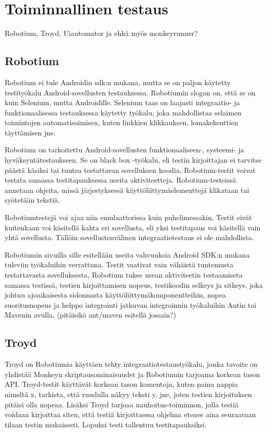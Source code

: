 \section{Toiminnallinen testaus}

Robotium, Troyd, Uiautomator ja ehkä myös monkeyrunner?

\subsection{Robotium}

Robotium ei tule Androidin sdk:n mukana, mutta se on paljon käytetty testityökalu Android-sovellusten testauksessa. Robotiumin slogan on, että se on kuin Selenium, mutta Androidille. Selenium taas on laajasti integraatio- ja funktionaalisessa testauksessa käytetty työkalu, joka mahdollistaa selaimen toimintojen automatisoimisen, kuten linkkien klikkauksen, lomakekenttien täyttämisen jne. \cite{selenium}

Robotium on tarkoitettu Android-sovellusten funktionaaliseen-, systeemi- ja hyväksyntätestaukseen. Se on black box -työkalu, eli testin kirjoittajan ei tarvitse päästä käsiksi tai tuntea testattavan sovelluksen koodia. Robotium-testit voivat testata samassa testitapauksessa useita aktiviteetteja. Robotium-testeissä annetaan ohjeita, missä järjestyksessä käyttöliittymäelementtejä klikataan tai syötetään tekstiä.

Robotiumtestejä voi ajaa niin emulaattorissa kuin puhelimessakin. Testit eivät kuitenkaan voi käsitellä kahta eri sovellusta, eli yksi testitapaus voi käsitellä vain yhtä sovellusta. Tällöin sovellustenvälinen integraatiotestaus ei ole mahdollista.

Robotiumin sivuilla sille esitellään useita vahvuuksia Android SDK:n mukana tuleviin työkaluihin verrattuna. Testit vaativat vain vähäistä tuntemusta testattavasta sovelluksesta, Robotium tukee usean aktiviteetin testaamiseta samassa testissä, testien kirjoittamisen nopeus, testikoodin selkeys ja sitkeys, joka johtuu ajoaikaisesta sidonnasta käyttöliittymäkomponentteihin, nopea suoritusnopeus ja helppo integrointi jatkuvan integroinnin työkaluihin Antin tai Mavenin avulla. (pitäisikö ant/maven esitellä jossain?) \cite{robotium}

\subsection{Troyd}

Troyd on Robotiumia käyttäen tehty integraatiotestaustyökalu, jonka tavoite on yhdistää Monkeyn skriptausominaisuudet ja Robotiumin tarjoama korkean tason API. Troyd-testit käyttävät korkean tason komentoja, kuten paina nappia nimeltä x, tarkista, että ruudulla näkyy teksti y, jne, joten testien kirjoituksen pitäisi olla nopeaa. Lisäksi Troyd tarjoaa nauhoitus-toiminnon, jolla testiä voidaan kirjoittaa siten, että testiä kirjoittaessa ohjelma etenee aina seuraavaan tilaan testin mukaisesti. Lopuksi testi tallentuu testitapauksiksi. \cite{troyd}

